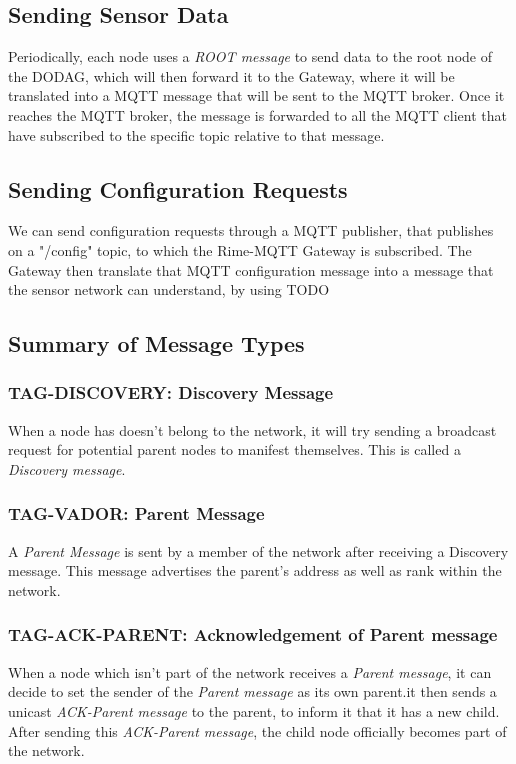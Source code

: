 \documentclass[a4paper,11pt]{article}
\begin{document}
\subsection{Sending Sensor Data}
Periodically, each node uses a \textit{ROOT message} to send data to the root node of the DODAG, which will then forward it to the Gateway, where it will be translated into a MQTT message that will be sent to the MQTT broker. Once it reaches the MQTT broker, the message is forwarded to all the MQTT client that have subscribed to the specific topic relative to that message.

\subsection{Sending Configuration Requests}
We can send configuration requests through a MQTT publisher, that publishes on a "/config" topic, to which the Rime-MQTT Gateway is subscribed. The Gateway then translate that MQTT configuration message into a message that the sensor network can understand, by using TODO


\subsection{Summary of Message Types}
\subsubsection{TAG-DISCOVERY: Discovery Message}
When a node has doesn't belong to the network, it will try sending a broadcast request for potential parent nodes to manifest themselves. This is called a \textit{Discovery message}.

\subsubsection{TAG-VADOR: Parent Message}
A \textit{Parent Message} is sent by a member of the network after receiving a Discovery message. This message advertises the parent's address as well as rank within the network.

\subsubsection{TAG-ACK-PARENT: Acknowledgement of Parent message}
When a node which isn't part of the network receives a \textit{Parent message}, it can decide to set the sender of the \textit{Parent message} as its own parent.it then sends a unicast \textit{ACK-Parent message} to the parent, to inform it that it has a new child. After sending this \textit{ACK-Parent message}, the child node officially becomes part of the network.
\end{document}
